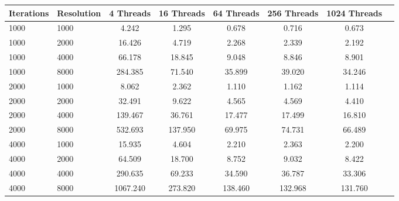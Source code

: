 \begin{tabular}{llcccccc}
\toprule
Iterations & Resolution & 4 Threads & 16 Threads & 64 Threads & 256 Threads & 1024 Threads \\
\midrule
1000 & 1000 & 4.242 & 1.295 & 0.678 & 0.716 & 0.673 \\
1000 & 2000 & 16.426 & 4.719 & 2.268 & 2.339 & 2.192 \\
1000 & 4000 & 66.178 & 18.845 & 9.048 & 8.846 & 8.901 \\
1000 & 8000 & 284.385 & 71.540 & 35.899 & 39.020 & 34.246 \\
2000 & 1000 & 8.062 & 2.362 & 1.110 & 1.162 & 1.114 \\
2000 & 2000 & 32.491 & 9.622 & 4.565 & 4.569 & 4.410 \\
2000 & 4000 & 139.467 & 36.761 & 17.477 & 17.499 & 16.810 \\
2000 & 8000 & 532.693 & 137.950 & 69.975 & 74.731 & 66.489 \\
4000 & 1000 & 15.935 & 4.604 & 2.210 & 2.363 & 2.200 \\
4000 & 2000 & 64.509 & 18.700 & 8.752 & 9.032 & 8.422 \\
4000 & 4000 & 290.635 & 69.233 & 34.590 & 36.787 & 33.306 \\
4000 & 8000 & 1067.240 & 273.820 & 138.460 & 132.968 & 131.760 \\
\bottomrule
\end{tabular}
